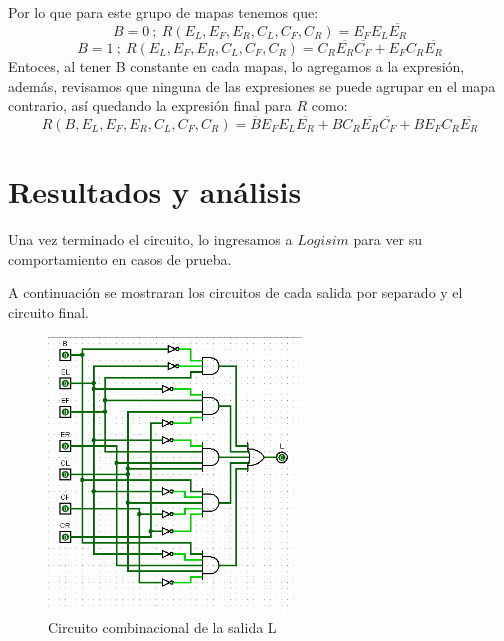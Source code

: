 \documentclass[a4paper]{article}
\begin{document}
Por lo que para este grupo de mapas tenemos que:
\begin{equation}
    B = 0\ ;\  R(E_L,E_F,E_R,C_L,C_F,C_R) = E_F E_L \overline{E_R}
\end{equation}
\begin{equation}
    B = 1\ ;\  R(E_L,E_F,E_R,C_L,C_F,C_R) =  C_R \overline{E_R} \overline{C_F} + E_F C_R \overline{E_R}
\end{equation}
Entoces, al tener B constante en cada mapas, lo agregamos a la expresión, además, revisamos que ninguna de las expresiones se puede agrupar en el mapa contrario, así quedando la expresión final para $R$ como:
\begin{equation}
    R(B,E_L,E_F,E_R,C_L,C_F,C_R) = \overline{B} E_F E_L \overline{E_R} + B C_R \overline{E_R} \overline{C_F} + B E_F C_R \overline{E_R}
\end{equation}
\newpage
\section{Resultados y análisis}

Una vez terminado el circuito, lo ingresamos a $Logisim$ para ver su comportamiento en casos de prueba.

A continuación se mostraran los circuitos de cada salida por separado y el circuito final.

\begin{figure}[!htbp]
    \centering
    \includegraphics[width=0.6\textwidth]{circuito_L.png}
    \caption{Circuito combinacional de la salida L}
    \label{fig:CircL}
\end{figure}
\end{document}

